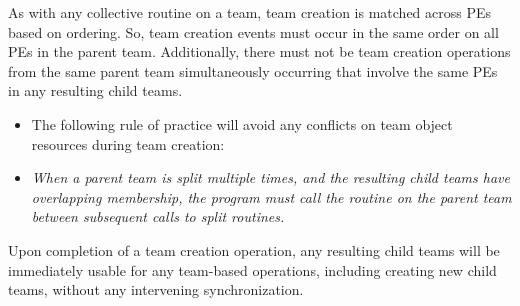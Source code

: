 As with any collective routine on a team, team creation is matched across PEs based
on ordering. So, team creation events must occur in the same order on all \acp{PE}
in the parent team. Additionally, there must not be team creation
operations from the same parent team simultaneously occurring that involve
the same \acp{PE} in any resulting child teams.

\begin{itemize}
\item[] The following rule of practice will avoid any conflicts on team
object resources during team creation:
\item[] \emph{When a parent team is split multiple times, and the resulting child teams
have overlapping membership, the program must call the 
routine on the parent team between subsequent calls to split routines.}
\end{itemize}

Upon completion of a team creation operation, any resulting child teams will be
immediately usable for any team-based operations, including creating new child teams,
without any intervening synchronization.
